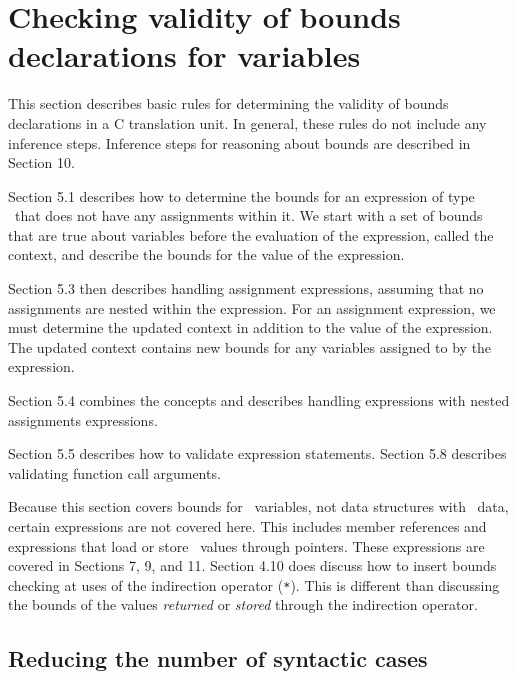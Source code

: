 
\chapter{Checking validity of bounds declarations for variables}
\label{chapter:checking-bounds}

This section describes basic rules for determining the validity of
bounds declarations in a C translation unit. In general, these rules do
not include any inference steps. Inference steps for reasoning about
bounds are described in Section 10.

Section 5.1 describes how to determine the bounds for an expression of
type \arrayptr\ that does not have any assignments within it.
We start with a set of bounds that are true about variables before the
evaluation of the expression, called the context, and describe the
bounds for the value of the expression.

Section 5.3 then describes handling assignment expressions, assuming
that no assignments are nested within the expression. For an assignment
expression, we must determine the updated context in addition to the
value of the expression. The updated context contains new bounds for any
variables assigned to by the expression.

Section 5.4 combines the concepts and describes handling expressions
with nested assignments expressions.

Section 5.5 describes how to validate expression statements. Section 5.8
describes validating function call arguments.

Because this section covers bounds for \arrayptr\ variables,
not data structures with \arrayptr\ data, certain expressions
are not covered here. This includes member references and expressions
that load or store \arrayptr\ values through pointers. These
expressions are covered in Sections 7, 9, and
11.  Section 4.10 does discuss how to insert bounds checking at uses of the
indirection operator (\texttt{*}). This is different than discussing the
bounds of the values \emph{returned} or \emph{stored} through the
indirection operator.

\section{Reducing the number of syntactic cases}\label{reducing-the-number-of-syntactic-cases}

